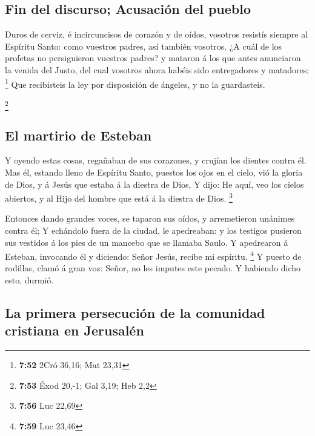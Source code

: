 \hypertarget{fin-del-discurso-acusaciuxf3n-del-pueblo}{%
\subsection{Fin del discurso; Acusación del
pueblo}\label{fin-del-discurso-acusaciuxf3n-del-pueblo}}

 Duros de cerviz, é incircuncisos de corazón y de oídos,
vosotros resistís siempre al Espíritu Santo: como vuestros padres, así
también vosotros.  ¿A cuál de los profetas no
persiguieron vuestros padres? y mataron á los que antes anunciaron la
venida del Justo, del cual vosotros ahora habéis sido entregadores y
matadores; \footnote{\textbf{7:52} 2Cró 36,16; Mat 23,31}
 Que recibisteis la ley por disposición de ángeles, y no
la guardasteis.

\footnote{\textbf{7:53} Éxod 20,-1; Gal 3,19; Heb 2,2}

\hypertarget{el-martirio-de-esteban}{%
\subsection{El martirio de Esteban}\label{el-martirio-de-esteban}}

 Y oyendo estas cosas, regañaban de sus corazones, y
crujían los dientes contra él.  Mas él, estando lleno de
Espíritu Santo, puestos los ojos en el cielo, vió la gloria de Dios, y á
Jesús que estaba á la diestra de Dios,  Y dijo: He aquí,
veo los cielos abiertos, y al Hijo del hombre que está á la diestra de
Dios. \footnote{\textbf{7:56} Luc 22,69}

 Entonces dando grandes voces, se taparon sus oídos, y
arremetieron unánimes contra él;  Y echándolo fuera de la
ciudad, le apedreaban: y los testigos pusieron sus vestidos á los pies
de un mancebo que se llamaba Saulo.  Y apedrearon á
Esteban, invocando él y diciendo: Señor Jesús, recibe mi espíritu.
\footnote{\textbf{7:59} Luc 23,46}  Y puesto de rodillas,
clamó á gran voz: Señor, no les imputes este pecado. Y habiendo dicho
esto, durmió.

\hypertarget{la-primera-persecuciuxf3n-de-la-comunidad-cristiana-en-jerusaluxe9n}{%
\subsection{La primera persecución de la comunidad cristiana en
Jerusalén}\label{la-primera-persecuciuxf3n-de-la-comunidad-cristiana-en-jerusaluxe9n}}

